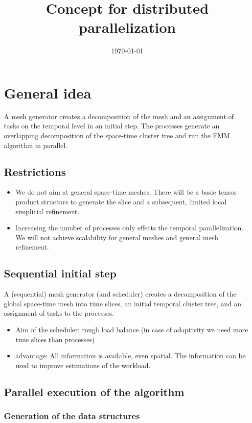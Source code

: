 \documentclass[a4paper]{scrartcl}
\begin{document}
\title{Concept for distributed parallelization}
\date{\today}
\maketitle

\section{General idea}
A mesh generator creates a decomposition of the mesh and
an assignment of tasks on the temporal level in an initial step. The processes
generate an overlapping decomposition of the space-time cluster tree and run
the FMM algorithm in parallel.
\subsection{Restrictions}
\begin{itemize}
\item  We do not aim at general space-time meshes. There will be a basic
  tensor product structure to generate the slice and a subsequent, limited local
  simplicial refinement.
\item Increasing the number of processes only effects the temporal
  parallelization. We will not achieve scalability for general meshes and general
  mesh refinement.
\end{itemize}
\subsection{Sequential initial step}
 A (sequential) mesh generator (and scheduler) creates a decomposition of the
 global space-time mesh into time slices, an initial temporal cluster tree, and an
 assignment of tasks to the processes.
\begin{itemize}
\item Aim of the scheduler: rough load balance (in case of adaptivity we need more time slices
  than processes)
\item advantage: All  information is available, even spatial. The information can
  be used to improve estimations of the workload.
\end{itemize}

\subsection{Parallel execution of the algorithm}

\subsubsection{Generation of the data structures}
\end{document}
